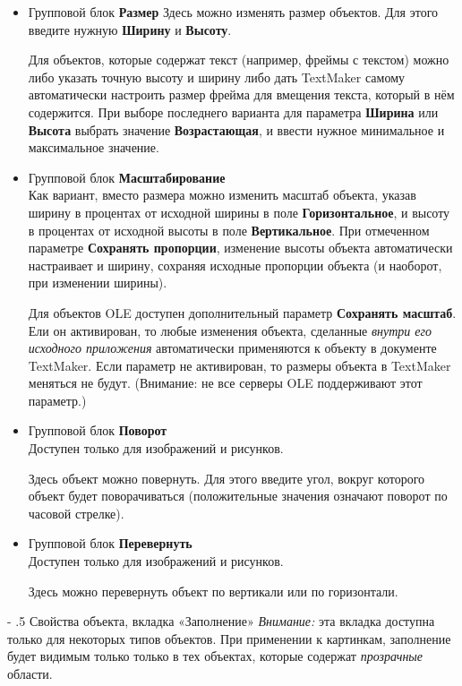 \documentclass[a4paper,10pt]{article}
\makeatletter
\renewcommand\paragraph{%
   \@startsection{paragraph}{4}{0mm}%
      {-\baselineskip}%
      {.5\baselineskip}%
      {\normalfont\normalsize\bfseries}}
\makeatother
\begin{document}
\begin{itemize}
 \item Групповой блок \textbf{Размер}
 Здесь можно изменять размер объектов. Для этого введите нужную \textbf{Ширину} и \textbf{Высоту}.
  
 Для объектов, которые содержат текст (например, фреймы с текстом) можно либо указать точную высоту и ширину либо дать TextMaker самому автоматически настроить размер фрейма для вмещения текста, который в нём содержится. При выборе последнего варианта для параметра \textbf{Ширина} или \textbf{Высота} выбрать значение \textbf{Возрастающая}, и ввести нужное минимальное и максимальное значение.
 
  \item Групповой блок \textbf{Масштабирование}\\
 Как вариант, вместо размера можно изменить масштаб объекта, указав ширину в процентах от исходной ширины в поле \textbf{Горизонтальное}, и высоту в процентах от исходной высоты в поле \textbf{Вертикальное}.
 При отмеченном параметре \textbf{Сохранять пропорции}, изменение высоты объекта автоматически настраивает и ширину, сохраняя исходные пропорции объекта (и наоборот, при изменении ширины).
 
 Для объектов OLE доступен дополнительный параметр \textbf{Сохранять масштаб}. Ели он активирован, то любые изменения объекта, сделанные \textit{внутри его исходного приложения} автоматически применяются к объекту в документе TextMaker. Если параметр не активирован, то размеры объекта в TextMaker меняться не будут. (Внимание: не все серверы OLE поддерживают этот параметр.)
 \item Групповой блок \textbf{Поворот}\\
 Доступен только для изображений и рисунков.
 
 Здесь объект можно повернуть. Для этого введите угол, вокруг которого объект будет поворачиваться (положительные значения означают поворот по часовой стрелке).
 \item Групповой блок \textbf{Перевернуть}\\
 Доступен только для изображений и рисунков.
 
 Здесь можно перевернуть объект по вертикали или по горизонтали. 
 \end{itemize}
 
 \paragraph{Свойства объекта, вкладка «Заполнение»}
 \textit{Внимание:} эта вкладка доступна только для некоторых типов объектов. При применении к картинкам, заполнение будет видимым только только в тех объектах, которые содержат \textit{прозрачные} области.
 
\end{document}
